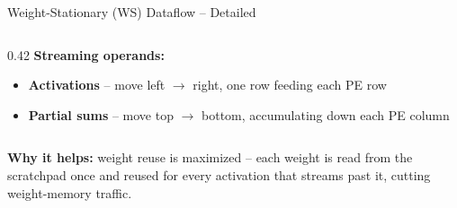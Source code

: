 \documentclass[aspectratio=169,10pt]{beamer}
\begin{document}
\begin{frame}{Weight-Stationary (WS) Dataflow -- Detailed}
\begin{columns}[T]
\begin{column}{0.42\textwidth}
      \vspace{2mm}
      \textbf{Streaming operands:}
      \begin{itemize}\small
        \item \textbf{Activations} -- move left $\to$ right, one row feeding each PE row
        \item \textbf{Partial sums} -- move top $\to$ bottom, accumulating down each PE column
      \end{itemize}
    \end{column}
  \end{columns}
  \vspace{2mm}
  \textbf{Why it helps:} weight reuse is maximized -- each weight is read from the scratchpad once and reused for every activation that streams past it, cutting weight-memory traffic.

  \vspace{3mm}
  \centering
\end{frame}
\end{document}
